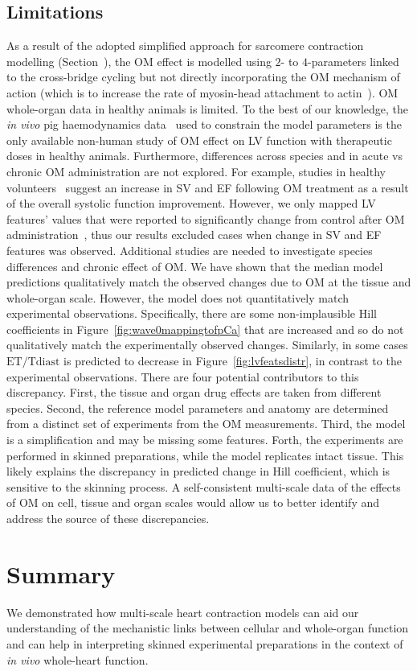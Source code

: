 \subsection{Limitations}\label{sec:ch7limitations}
As a result of the adopted simplified approach for sarcomere contraction modelling (Section~), the OM effect is modelled using $2$- to $4$-parameters linked to the cross-bridge cycling but not directly incorporating the OM mechanism of action (which is to increase the rate of myosin-head attachment to actin~\cite{Malik:2011}). OM whole-organ data in healthy animals is limited. To the best of our knowledge, the \textit{in vivo} pig haemodynamics data~\cite{Bakkehaug:2015} used to constrain the model parameters is the only available non-human study of OM effect on LV function with therapeutic doses in healthy animals. Furthermore, differences across species and in acute vs chronic OM administration are not explored. For example, studies in healthy volunteers~\cite{Teerlink:2011} suggest an increase in SV and EF following OM treatment as a result of the overall systolic function improvement. However, we only mapped LV features' values that were reported to significantly change from control after OM administration~\cite{Bakkehaug:2015}, thus our results excluded cases when change in SV and EF features was observed. Additional studies are needed to investigate species differences and chronic effect of OM. We have shown that the median model predictions qualitatively match the observed changes due to OM at the tissue and whole-organ scale. However, the model does not quantitatively match experimental observations. Specifically, there are some non-implausible Hill coefficients in Figure~\ref{fig:wave0mappingtofpCa} that are increased and so do not qualitatively match the experimentally observed changes. Similarly, in some cases $\textrm{ET}/\textrm{Tdiast}$ is predicted to decrease in Figure~\ref{fig:lvfeatsdistr}, in contrast to the experimental observations. There are four potential contributors to this discrepancy. First, the tissue and organ drug effects are taken from different species. Second, the reference model parameters and anatomy are determined from a distinct set of experiments from the OM measurements. Third, the model is a simplification and may be missing some features. Forth, the experiments are performed in skinned preparations, while the model replicates intact tissue. This likely explains the discrepancy in predicted change in Hill coefficient, which is sensitive to the skinning process. A self-consistent multi-scale data of the effects of OM on cell, tissue and organ scales would allow us to better identify and address the source of these discrepancies.


%
%
%
\section{Summary}\label{sec:ch5summary}
We demonstrated how multi-scale heart contraction models can aid our understanding of the mechanistic links between cellular and whole-organ function and can help in interpreting skinned experimental preparations in the context of \textit{in vivo} whole-heart function.